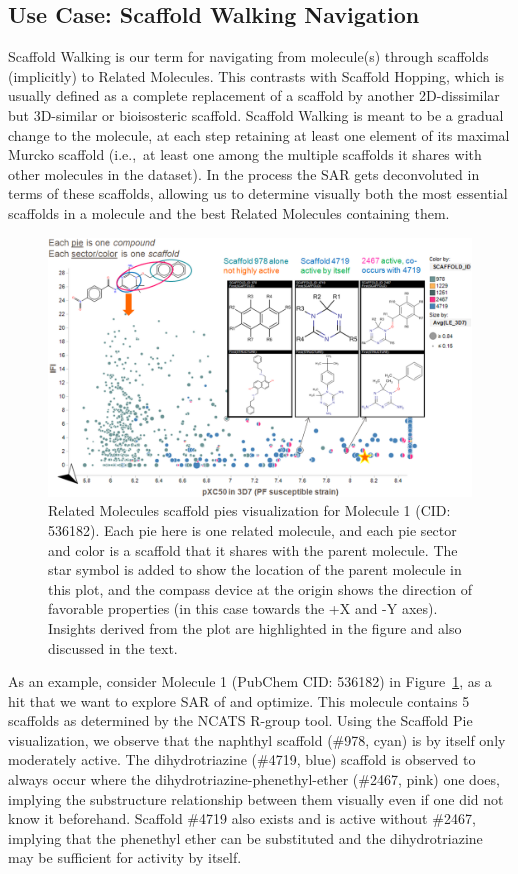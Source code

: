 \documentclass[journal=jacsat,manuscript=article]{achemso}
\newcommand*\fref[1]{Figure~\ref{fig:#1}}
\newcommand*\ie{i.e.,~}
\begin{document}
\subsection{Use Case: Scaffold Walking Navigation}
\label{sec:scafwalk}
Scaffold Walking is our term for navigating from molecule(s) through scaffolds (implicitly) to Related Molecules. This contrasts with Scaffold Hopping, which is usually defined as a complete replacement of a scaffold by another 2D-dissimilar but 3D-similar or bioisosteric scaffold. Scaffold Walking is meant to be a gradual change to the molecule, at each step retaining at least one element of its maximal Murcko scaffold (\ie at least one among the multiple scaffolds it shares with other molecules in the dataset).  In the process the SAR gets deconvoluted in terms of these scaffolds, allowing us to determine visually both the most essential scaffolds in a molecule and the best Related Molecules containing them.       
\begin{figure}
\includegraphics[width=6in]{fig/mol1_RGtool_scafpie.png}
\caption{Related Molecules scaffold pies visualization for Molecule 1 (CID: 536182). Each pie here is one related molecule, and each pie sector and color is a scaffold that it shares with the parent molecule. The star symbol is added to show the location of the parent molecule in this plot, and the compass device at the origin shows the direction of favorable properties (in this case towards the +X and -Y axes). Insights derived from the plot are highlighted in the figure and also discussed in the text.}
\label{fig:scafwalk1}
\end{figure}

As an example, consider Molecule 1 (PubChem CID: 536182) in \fref{scafwalk1}, as a hit that we want to explore SAR of and optimize. This molecule contains 5 scaffolds as determined by the NCATS R-group tool. Using the Scaffold Pie visualization, we observe that the naphthyl scaffold (\#978, cyan) is by itself only moderately active.  The dihydrotriazine (\#4719, blue) scaffold is observed to always occur where the dihydrotriazine-phenethyl-ether (\#2467, pink) one does, implying the substructure relationship between them visually even if one did not know it beforehand. Scaffold \#4719 also exists and is active without \#2467, implying that the phenethyl ether can be substituted and the dihydrotriazine may be sufficient for activity by itself.
\end{document}
